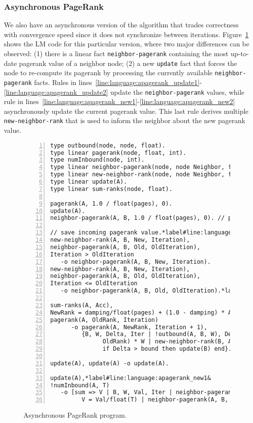 \subsubsection{Asynchronous PageRank}

We also have an asynchronous version of the algorithm that trades correctness
with convergence speed since it does not synchronize between iterations.
Figure~\ref{language:code:async_pagerank} shows the LM code for this particular
version, where two major differences can be observed: (1) there is a linear fact
\texttt{neighbor-pagerank} containing the most up-to-date pagerank value of a
neighbor node; (2) a new \texttt{update} fact that forces the node to re-compute
its pagerank by processing the currently available \texttt{neighbor-pagerank}
facts. Rules in
lines~\ref{line:language:apagerank_update1}-\ref{line:language:apagerank_update2}
update the \texttt{neighbor-pagerank} values, while rule in
lines~\ref{line:language:apagerank_new1}-\ref{line:language:apagerank_new2}
asynchronously update the current pagerank value. This last rule derives
multiple \texttt{new-neighbor-rank} that is used to inform the neighbor about
the new pagerank value.

\begin{figure}[h!]
\begin{Verbatim}[numbers=left,fontsize=\codesize,commandchars=\*\#\&]
type outbound(node, node, float).
type linear pagerank(node, float, int).
type numInbound(node, int).
type linear neighbor-pagerank(node, node Neighbor, float Rank, int Iteration).
type linear new-neighbor-rank(node, node Neighbor, float Rank, int Iteration).
type linear update(A).
type linear sum-ranks(node, float).

pagerank(A, 1.0 / float(pages), 0).
update(A).
neighbor-pagerank(A, B, 1.0 / float(pages), 0). // pagerank of B is ...

// save incoming pagerank value.*label#line:language:apagerank_update1&
new-neighbor-rank(A, B, New, Iteration),
neighbor-pagerank(A, B, Old, OldIteration),
Iteration > OldIteration
   -o neighbor-pagerank(A, B, New, Iteration).
new-neighbor-rank(A, B, New, Iteration),
neighbor-pagerank(A, B, Old, OldIteration),
Iteration <= OldIteration
   -o neighbor-pagerank(A, B, Old, OldIteration).*label#line:language:apagerank_update2&

sum-ranks(A, Acc),
NewRank = damping/float(pages) + (1.0 - damping) * Acc,
pagerank(A, OldRank, Iteration)
      -o pagerank(A, NewRank, Iteration + 1),
         {B, W, Delta, Iter | !outbound(A, B, W), Delta = fabs(NewRank -
               OldRank) * W | new-neighbor-rank(B, A, NewRank, Iteration + 1),
               if Delta > bound then update(B) end}.

update(A), update(A) -o update(A).

update(A),*label#line:language:apagerank_new1&
!numInbound(A, T)
   -o [sum => V | B, W, Val, Iter | neighbor-pagerank(A, B, Val, Iter),
         V = Val/float(T) | neighbor-pagerank(A, B, Val, Iter) | sum-ranks(A, V)].*label#line:language:apagerank_new2&
\end{Verbatim}
\caption{Asynchronous PageRank program.}
\label{language:code:async_pagerank}
\end{figure}

